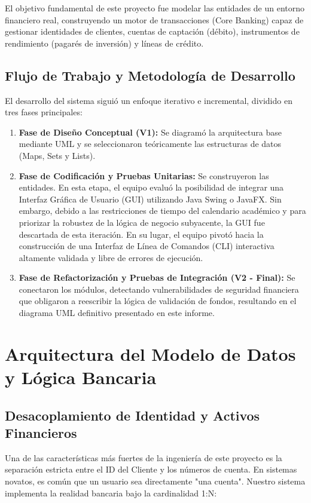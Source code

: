 \documentclass[12pt, letterpaper]{article}
\begin{document}
	El objetivo fundamental de este proyecto fue modelar las entidades de un entorno financiero real, construyendo un motor de transacciones (Core Banking) capaz de gestionar identidades de clientes, cuentas de captación (débito), instrumentos de rendimiento (pagarés de inversión) y líneas de crédito. 
	
	\subsection{Flujo de Trabajo y Metodología de Desarrollo}
	El desarrollo del sistema siguió un enfoque iterativo e incremental, dividido en tres fases principales:
	\begin{enumerate}
		\item \textbf{Fase de Diseño Conceptual (V1):} Se diagramó la arquitectura base mediante UML \cite{drawio_uml} y se seleccionaron teóricamente las estructuras de datos (Maps, Sets y Lists).
		\item \textbf{Fase de Codificación y Pruebas Unitarias:} Se construyeron las entidades. En esta etapa, el equipo evaluó la posibilidad de integrar una Interfaz Gráfica de Usuario (GUI) utilizando Java Swing o JavaFX. Sin embargo, debido a las restricciones de tiempo del calendario académico y para priorizar la robustez de la lógica de negocio subyacente, la GUI fue descartada de esta iteración. En su lugar, el equipo pivotó hacia la construcción de una Interfaz de Línea de Comandos (CLI) interactiva altamente validada y libre de errores de ejecución.
		\item \textbf{Fase de Refactorización y Pruebas de Integración (V2 - Final):} Se conectaron los módulos, detectando vulnerabilidades de seguridad financiera que obligaron a reescribir la lógica de validación de fondos, resultando en el diagrama UML definitivo presentado en este informe.
	\end{enumerate}
	
	\section{Arquitectura del Modelo de Datos y Lógica Bancaria}
	
	\subsection{Desacoplamiento de Identidad y Activos Financieros}
	Una de las características más fuertes de la ingeniería de este proyecto es la separación estricta entre el ID del Cliente y los números de cuenta. En sistemas novatos, es común que un usuario sea directamente "una cuenta". Nuestro sistema implementa la realidad bancaria bajo la cardinalidad 1:N:
	
\end{document}

